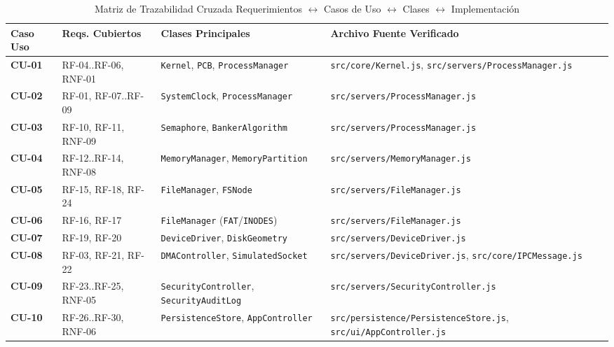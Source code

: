 \documentclass[10pt,twocolumn,letterpaper]{article}
\begin{document}
\begin{table}[!t]
\caption{Matriz de Trazabilidad Cruzada Requerimientos $\leftrightarrow$ Casos de Uso $\leftrightarrow$ Clases $\leftrightarrow$ Implementaci\'on}
\label{tab:trazabilidad}
\centering
\scriptsize
\renewcommand{\arraystretch}{1.12}
\begin{tabularx}{\textwidth}{L{1.4cm} L{2.8cm} L{4.2cm} Y}
\toprule
\textbf{Caso Uso} & \textbf{Reqs. Cubiertos} & \textbf{Clases Principales} & \textbf{Archivo Fuente Verificado} \\
\midrule
\textbf{CU-01} & RF-04..RF-06, RNF-01 & \texttt{Kernel}, \texttt{PCB}, \texttt{ProcessManager} & \texttt{src/core/Kernel.js}, \texttt{src/servers/ProcessManager.js} \\
\textbf{CU-02} & RF-01, RF-07..RF-09 & \texttt{SystemClock}, \texttt{ProcessManager} & \texttt{src/servers/ProcessManager.js} \\
\textbf{CU-03} & RF-10, RF-11, RNF-09 & \texttt{Semaphore}, \texttt{BankerAlgorithm} & \texttt{src/servers/ProcessManager.js} \\
\textbf{CU-04} & RF-12..RF-14, RNF-08 & \texttt{MemoryManager}, \texttt{MemoryPartition} & \texttt{src/servers/MemoryManager.js} \\
\textbf{CU-05} & RF-15, RF-18, RF-24 & \texttt{FileManager}, \texttt{FSNode} & \texttt{src/servers/FileManager.js} \\
\textbf{CU-06} & RF-16, RF-17 & \texttt{FileManager} (\texttt{FAT}/\texttt{INODES}) & \texttt{src/servers/FileManager.js} \\
\textbf{CU-07} & RF-19, RF-20 & \texttt{DeviceDriver}, \texttt{DiskGeometry} & \texttt{src/servers/DeviceDriver.js} \\
\textbf{CU-08} & RF-03, RF-21, RF-22 & \texttt{DMAController}, \texttt{SimulatedSocket} & \texttt{src/servers/DeviceDriver.js}, \texttt{src/core/IPCMessage.js} \\
\textbf{CU-09} & RF-23..RF-25, RNF-05 & \texttt{SecurityController}, \texttt{SecurityAuditLog} & \texttt{src/servers/SecurityController.js} \\
\textbf{CU-10} & RF-26..RF-30, RNF-06 & \texttt{PersistenceStore}, \texttt{AppController} & \texttt{src/persistence/PersistenceStore.js}, \texttt{src/ui/AppController.js} \\
\bottomrule
\end{tabularx}
\end{table}
\end{document}
